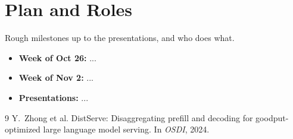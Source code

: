 \documentclass[11pt]{article}
\begin{document}
\section{Plan and Roles}
Rough milestones up to the presentations, and who does what.

\begin{itemize}
  \item \textbf{Week of Oct 26:} ...
  \item \textbf{Week of Nov 2:} ...
  \item \textbf{Presentations:} ...
\end{itemize}

\begin{thebibliography}{9}
\small
{}
Y.~Zhong et al.
\newblock DistServe: Disaggregating prefill and decoding for goodput-optimized
  large language model serving.
\newblock In \emph{OSDI}, 2024.
\end{thebibliography}
\end{document}
